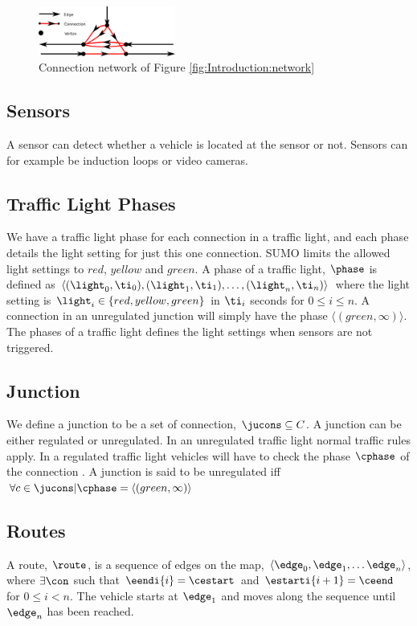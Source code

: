 \begin{figure}[h]
\centering
\includegraphics[width=0.4\textwidth]{images/ConnectionNetwork.png}
\caption{Connection network of Figure \ref{fig:Introduction:network}}
\label{fig:Model:Connection}
\end{figure}

\subsection{Sensors}
A sensor can detect whether a vehicle is located at the sensor or not. 
Sensors can for example be induction loops or video cameras. %

\subsection{Traffic Light Phases}
We have a traffic light phase for each connection in a traffic light, and each phase details the light setting for just this one connection.
SUMO limits the allowed light settings to $red$, $yellow$ and $green$.
A phase of a traffic light, $\phase$ is defined as $\langle(\light_0, \ti_0),(\light_1, \ti_1),\dots, (\light_n, \ti_n) \rangle$ where the light setting is $\light_i\in \{red, yellow, green\}$ in $\ti_i$ seconds for $0 \leq i \leq n$.
A connection in an unregulated junction will simply have the phase $\langle(green, \infty)\rangle$.
The phases of a traffic light defines the light settings when sensors are not triggered. 


\subsection{Junction}
We define a junction \ju to be a set of connection, $\jucons \subseteq C$. 
A junction can be either regulated or unregulated. 
In an unregulated traffic light normal traffic rules apply. 
In a regulated traffic light vehicles will have to check the phase $\cphase$ of the connection \vehpos. 
A junction is said to be unregulated iff $\forall c \in \jucons | \cphase = \langle(green, \infty)\rangle$

\subsection{Routes}
A route, $\route$, is a sequence of edges on the map, $\langle \edge_0, \edge_1, \dots \edge_n \rangle$, where $\exists \con$ such that $\eendi{i} = \cestart$ and $\estarti{i+1} = \ceend$ for $0\leq i< n$.
The vehicle starts at $\edge_1$ and moves along the sequence until $\edge_n$ has been reached.